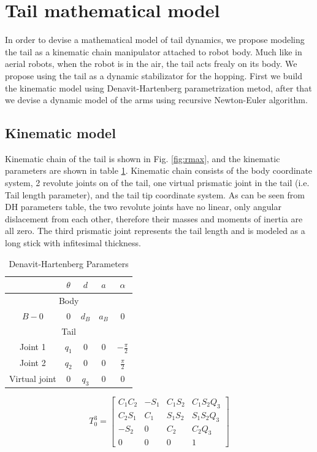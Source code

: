 \section{Tail mathematical model}
In order to devise a mathematical model of tail dynamics, we propose modeling the tail as a kinematic chain manipulator attached to robot body. Much like in aerial robots, when the robot is in the air, the tail acts frealy on its body. We propose using the tail as a dynamic stabilizator for the hopping. First we build the kinematic model using Denavit-Hartenberg parametrization metod, after that we devise a dynamic model of the arms using recursive Newton-Euler algorithm.

\subsection{Kinematic model}
Kinematic chain of the tail is shown in Fig. \ref{fig:rmax}, and the kinematic parameters are shown in table \ref{tab:DHParameters}. Kinematic chain consists of the body coordinate system, 2 revolute joints on of the tail, one virtual prismatic joint in the tail (i.e. Tail length parameter), and the tail tip coordinate system. As can be seen from DH parameters table, the two revolute joints have no linear, only angular dislacement from each other, therefore their masses and moments of inertia are all zero. The third prismatic joint represents the tail length and is modeled as a long stick with infitesimal thickness. 

\begin{table}
	\centering
		\begin{tabular}{ccccc}
		\hline
			& $\theta$ & $d$ & $a$ & $\alpha$ \\\hline
			\multicolumn{5}{c}{Body}\\\hline
			$B-0$ & $0$ & $d_B$ & $a_B$ & $0$\\\hline
			\multicolumn{5}{c}{Tail}\\\hline
			Joint 1 & $q_1$ & $0$ & $0$ & $-\frac{\pi}{2}$\\
			Joint 2 & $q_2$ & $0$ & $0$ & $\frac{\pi}{2}$\\
			Virtual joint& $0$ & $q_3$ & $0$ & $0$\\\hline
		\end{tabular}
	\caption{Denavit-Hartenberg Parameters}\label{tab:DHParameters}
\end{table}

\begin{equation}
T_0^3=\begin{bmatrix}
C_1 C_2 & -S_1 & C_1 S_2 & C_1 S_2 Q_3 \\
C_2 S_1 & C_1 & S_1 S_2 & S_1 S_2 Q_3 \\
-S_2 & 0 & C_2 & C_2 Q_3 \\
 0 & 0 & 0 & 1
\end{bmatrix}
\end{equation}

